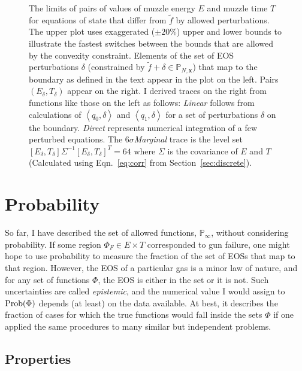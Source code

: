 \documentclass[]{article}
\newcommand{\nomf}{\tilde f} \newcommand{\COST}{\cal C}
\newcommand{\field}[1]{\mathbb{#1}}
\newcommand\Polytope[1]{\field{P}_{#1}}
\newcommand\PolytopeN{\Polytope{N,\mathbf{x}}}
\newcommand\PolytopeInf{\Polytope{\infty}}
\newcommand\inner[2]{\left<#1,#2\right>}
\begin{document}
\begin{figure*}
  \centering
    \caption{The limits of pairs of values of muzzle energy $E$ and
      muzzle time $T$ for equations of state that differ from $\nomf$
      by allowed perturbations.  The upper plot uses exaggerated ($\pm
      20\%$) upper and lower bounds to illustrate the fastest switches
      between the bounds that are allowed by the convexity constraint.
      Elements of the set of EOS perturbations $\delta$ (constrained
      by $\nomf+ \delta \in \PolytopeN$) that map to the boundary as
      defined in the text appear in the plot on the left.  Pairs
      $(E_\delta, T_\delta)$ appear on the right.  I derived traces on
      the right from functions like those on the left as follows:
      \emph{Linear} follows from calculations of $\inner{q_0}{\delta}$
      and $\inner{q_1}{\delta}$ for a set of perturbations $\delta$ on
      the boundary.  \emph{Direct} represents numerical integration of
      a few perturbed equations.  The $6\sigma$\emph{Marginal} trace
      is the level set $\left[ E_\delta, T_\delta\right] \Sigma^{-1}
      \left[ E_\delta, T_\delta \right]^T = 64$ where $\Sigma$ is the
      covariance of $E$ and $T$ (Calculated using Eqn.~\eqref{eq:corr}
      from Section~\ref{sec:discrete}).}
  \label{fig:allowedET}
\end{figure*}

\section{Probability}
\label{sec:probability}

So far, I have described the set of allowed functions, $\PolytopeInf$,
without considering probability.  If some region $\Phi_{F} \in E\times
T$ corresponded to gun failure, one might hope to use probability to
measure the fraction of the set of EOSs that map to that region.
However, the EOS of a particular gas is a minor law of nature, and for
any set of functions $\Phi$, the EOS is either in the set or it is
not.  Such uncertainties are called \emph{epistemic}, and the
numerical value I would assign to $\text{Prob}(\Phi)$ depends (at least) on
the data available.  At best, it describes the fraction of cases for
which the true functions would fall inside the sets $\Phi$ if one
applied the same procedures to many similar but independent problems.

\subsection{Properties}
\label{sec:properties}
\end{document}
